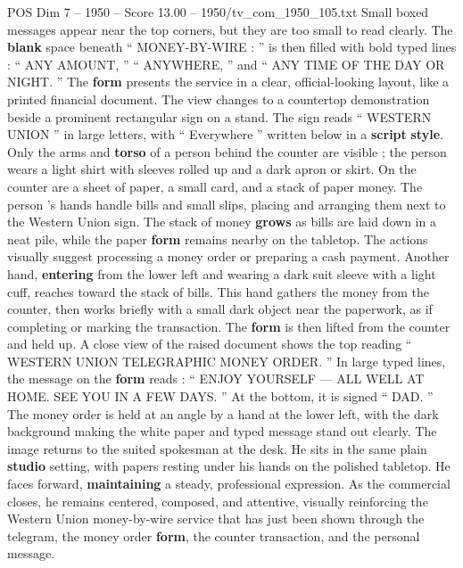 \begin{textsample}{POS Dim 7 – 1950 – Score 13.00 – 1950/tv\_com\_1950\_105.txt}
Small boxed messages appear near the top corners, but they are too small to read clearly.
The \textbf{blank} space beneath “ MONEY-BY-WIRE : ” is then filled with bold typed lines : “ ANY AMOUNT, ” “ ANYWHERE, ” and “ ANY TIME OF THE DAY OR NIGHT. ” The \textbf{form} presents the service in a clear, official-looking layout, like a printed financial document.
The view changes to a countertop demonstration beside a prominent rectangular sign on a stand.
The sign reads “ WESTERN UNION ” in large letters, with “ Everywhere ” written below in a \textbf{script} \textbf{style}.
Only the arms and \textbf{torso} of a person behind the counter are visible ; the person wears a light shirt with sleeves rolled up and a dark apron or skirt.
On the counter are a sheet of paper, a small card, and a stack of paper money.
The person ’s hands handle bills and small slips, placing and arranging them next to the Western Union sign.
The stack of money \textbf{grows} as bills are laid down in a neat pile, while the paper \textbf{form} remains nearby on the tabletop.
The actions visually suggest processing a money order or preparing a cash payment.
Another hand, \textbf{entering} from the lower left and wearing a dark suit sleeve with a light cuff, reaches toward the stack of bills.
This hand gathers the money from the counter, then works briefly with a small dark object near the paperwork, as if completing or marking the transaction.
The \textbf{form} is then lifted from the counter and held up.
A close view of the raised document shows the top reading “ WESTERN UNION TELEGRAPHIC MONEY ORDER. ” In large typed lines, the message on the \textbf{form} reads : “ ENJOY YOURSELF — ALL WELL AT HOME.
SEE YOU IN A FEW DAYS. ” At the bottom, it is signed “ DAD. ” The money order is held at an angle by a hand at the lower left, with the dark background making the white paper and typed message stand out clearly.
The image returns to the suited spokesman at the desk.
He sits in the same plain \textbf{studio} setting, with papers resting under his hands on the polished tabletop.
He faces forward, \textbf{maintaining} a steady, professional expression.
As the commercial closes, he remains centered, composed, and attentive, visually reinforcing the Western Union money-by-wire service that has just been shown through the telegram, the money order \textbf{form}, the counter transaction, and the personal message.

\end{textsample}
